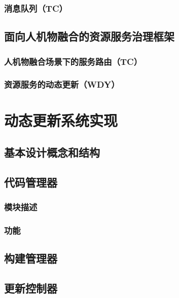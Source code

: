 \documentclass[12pt,a4paper]{article}
\begin{document}
\subsubsection{消息队列（TC）}

\subsection{面向人机物融合的资源服务治理框架}
\subsubsection{人机物融合场景下的服务路由（TC）}
\subsubsection{资源服务的动态更新（WDY）}
\section{动态更新系统实现}\label{}

\subsection{基本设计概念和结构}

\subsection{代码管理器}
\subsubsection{模块描述}
\subsubsection{功能}

\subsection{构建管理器}

\subsection{更新控制器}

\end{document}
